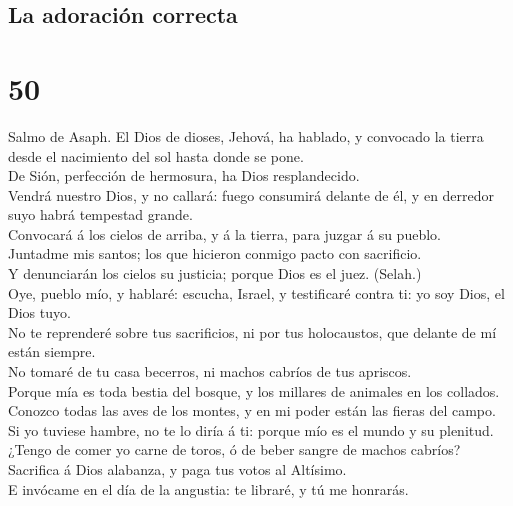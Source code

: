 \hypertarget{la-adoraciuxf3n-correcta}{%
\subsection{La adoración correcta}\label{la-adoraciuxf3n-correcta}}

\hypertarget{section-49}{%
\section{50}\label{section-49}}

 Salmo de Asaph. El Dios de dioses, Jehová, ha hablado, y
convocado la tierra desde el nacimiento del sol hasta donde se pone.\\
 De Sión, perfección de hermosura, ha Dios
resplandecido.\\
 Vendrá nuestro Dios, y no callará: fuego consumirá
delante de él, y en derredor suyo habrá tempestad grande.\\
 Convocará á los cielos de arriba, y á la tierra, para
juzgar á su pueblo.\\
 Juntadme mis santos; los que hicieron conmigo pacto con
sacrificio.\\
 Y denunciarán los cielos su justicia; porque Dios es el
juez. (Selah.)\\
 Oye, pueblo mío, y hablaré: escucha, Israel, y
testificaré contra ti: yo soy Dios, el Dios tuyo.\\
 No te reprenderé sobre tus sacrificios, ni por tus
holocaustos, que delante de mí están siempre.\\
 No tomaré de tu casa becerros, ni machos cabríos de tus
apriscos.\\
 Porque mía es toda bestia del bosque, y los millares de
animales en los collados.\\
 Conozco todas las aves de los montes, y en mi poder
están las fieras del campo.\\
 Si yo tuviese hambre, no te lo diría á ti: porque mío es
el mundo y su plenitud.\\
 ¿Tengo de comer yo carne de toros, ó de beber sangre de
machos cabríos?\\
 Sacrifica á Dios alabanza, y paga tus votos al
Altísimo.\\
 E invócame en el día de la angustia: te libraré, y tú me
honrarás.\\
